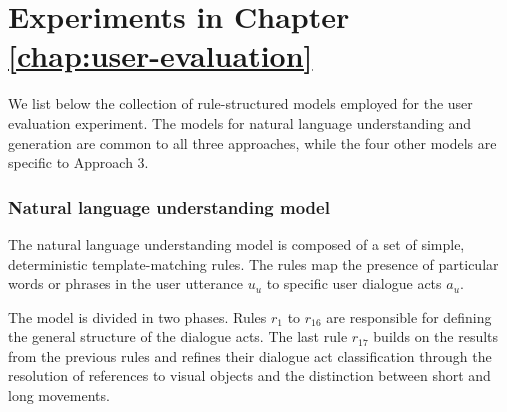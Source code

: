 \section{Experiments in Chapter \ref{chap:user-evaluation}}
\label{sec:domainspecs-usereval}

We list below the collection of rule-structured models employed for the user evaluation experiment.  The models for natural language understanding and generation are common to all three approaches, while the four other models are specific to Approach 3.

\subsubsection*{Natural language understanding model}

The natural language understanding model is composed of a set of simple, deterministic template-matching rules.  The rules map the presence of particular words or phrases in the user utterance $u_u$ to specific user dialogue acts $a_u$. 

The model is divided in two phases.  Rules $r_1$ to $r_{16}$ are responsible for defining the general structure of the dialogue acts.  The last rule $r_{17}$ builds on the results from the previous rules and refines their dialogue act classification through the resolution of references to visual objects and the distinction between short and long movements. 

